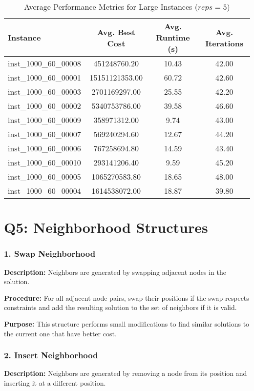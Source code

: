 \documentclass{article}
\begin{document}
\begin{table}[H]
\centering
\caption{Average Performance Metrics for Large Instances ($reps=5$)}
\begin{tabular}{lccc}
\toprule
\textbf{Instance} & \textbf{Avg. Best Cost} & \textbf{Avg. Runtime (s)} & \textbf{Avg. Iterations} \\
\midrule
inst\_1000\_60\_00008 & 451248760.20   & 10.43 & 42.00 \\
inst\_1000\_60\_00001 & 15151121353.00 & 60.72 & 42.60 \\
inst\_1000\_60\_00003 & 2701169297.00  & 25.55 & 42.20 \\
inst\_1000\_60\_00002 & 5340753786.00  & 39.58 & 46.60 \\
inst\_1000\_60\_00009 & 358971312.00   & 9.74  & 43.00 \\
inst\_1000\_60\_00007 & 569240294.60   & 12.67 & 44.20 \\
inst\_1000\_60\_00006 & 767258694.80   & 14.59 & 43.40 \\
inst\_1000\_60\_00010 & 293141206.40   & 9.59  & 45.20 \\
inst\_1000\_60\_00005 & 1065270583.80  & 18.65 & 48.00 \\
inst\_1000\_60\_00004 & 1614538072.00  & 18.87 & 39.80 \\
\bottomrule
\end{tabular}
\label{tab:avg_metrics_1000_60}
\end{table}


\section*{Q5: Neighborhood Structures}
\subsubsection*{1. Swap Neighborhood}
\textbf{Description:} Neighbors are generated by swapping adjacent nodes in the solution.

\noindent \textbf{Procedure:}  For all adjacent node pairs, swap their positions if the swap respects constraints and add the resulting solution to the set of neighbors if it is valid.

\noindent \textbf{Purpose:} This structure performs small modifications to find similar solutions to the current one that have better cost.

\subsubsection*{2. Insert Neighborhood}
\textbf{Description:} Neighbors are generated by removing a node from its position and inserting it at a different position.
\end{document}
